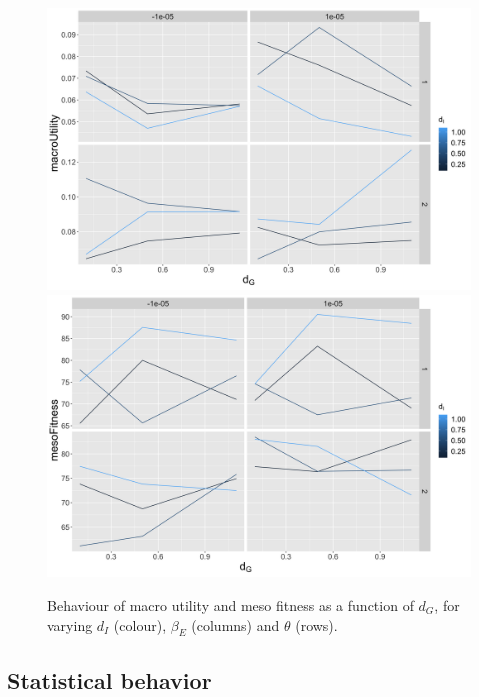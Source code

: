 \documentclass[letterpaper]{article}
\begin{document}
\begin{figure}
    \includegraphics[width=\linewidth]{figures/macroUtility-macroGravityDecay_color-macroInnovationDecay_facet-mesoToMacroInnovationThreshold-macroToMesoExchangeMaxUpdate_mesoCrossOverProba05.png}
    \includegraphics[width=\linewidth]{figures/mesoFitness-macroGravityDecay_color-macroInnovationDecay_facet-mesoToMacroInnovationThreshold-macroToMesoExchangeMaxUpdate_mesoCrossOverProba05.png}
    \caption{Behaviour of macro utility and meso fitness as a function of $d_G$, for varying $d_I$ (colour), $\beta_E$ (columns) and $\theta$ (rows).\label{fig:explo}}
\end{figure}

\subsection{Statistical behavior}
\end{document}
